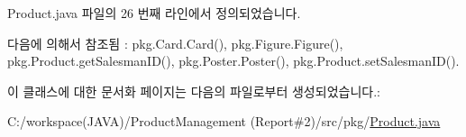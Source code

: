 Product.\+java 파일의 26 번째 라인에서 정의되었습니다.



다음에 의해서 참조됨 \+:  pkg.\+Card.\+Card(), pkg.\+Figure.\+Figure(), pkg.\+Product.\+get\+Salesman\+I\+D(), pkg.\+Poster.\+Poster(), pkg.\+Product.\+set\+Salesman\+I\+D().



이 클래스에 대한 문서화 페이지는 다음의 파일로부터 생성되었습니다.\+:\begin{DoxyCompactItemize}
\item 
C\+:/workspace(\+J\+A\+V\+A)/\+Product\+Management (\+Report\#2)/src/pkg/\hyperlink{_product_8java}{Product.\+java}\end{DoxyCompactItemize}
